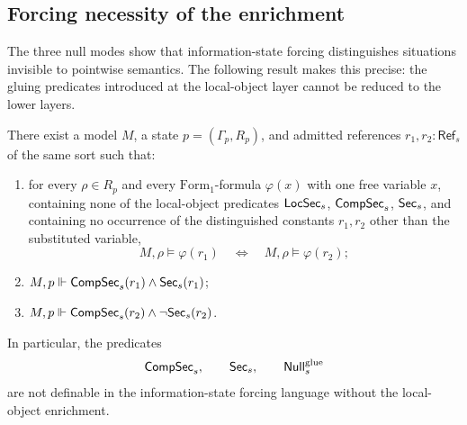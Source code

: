 \subsection{Forcing necessity of the enrichment}

The three null modes show that information-state forcing distinguishes situations invisible to pointwise semantics. The following result makes this precise: the gluing predicates introduced at the local-object layer cannot be reduced to the lower layers.

\begin{theorem}\label{thm:pointwise-irreducibility}
There exist a model $M$, a state $p=(\Gamma_p,R_p)$, and admitted references $r_1,r_2:\mathsf{Ref}_s$ of the same sort such that:
\begin{enumerate}[label=(\roman*),nosep]
\item for every $\rho\in R_p$ and every $\mathrm{Form}_1$-formula $\varphi(x)$ with one free variable $x$, containing none of the local-object predicates $\mathsf{LocSec}_s$, $\mathsf{CompSec}_s$, $\mathsf{Sec}_s$, and containing no occurrence of the distinguished constants $r_1,r_2$ other than the substituted variable,
\[
M,\rho\models\varphi(r_1)
\quad\Longleftrightarrow\quad
M,\rho\models\varphi(r_2);
\]
\item $M,p\Vdash \mathsf{CompSec}_s(r_1)\land \mathsf{Sec}_s(r_1)$;
\item $M,p\Vdash \mathsf{CompSec}_s(r_2)\land \neg\mathsf{Sec}_s(r_2)$.
\end{enumerate}
In particular, the predicates
\[
\mathsf{CompSec}_s,
\qquad
\mathsf{Sec}_s,
\qquad
\mathsf{Null}^{\mathrm{glue}}_s
\]
are not definable in the information-state forcing language without the local-object enrichment.
\end{theorem}

